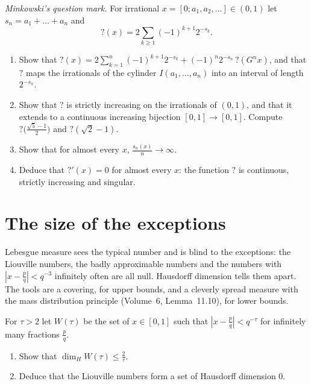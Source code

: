 \begin{exercise}[$\star\star\star$]\label{pb:minkowski}
\emph{Minkowski's question mark.} For irrational $x=[0;a_1,a_2,\dots]\in(0,1)$ let $s_n=a_1+\dots+a_n$ and
\[
?(x)=2\sum_{k\ge1}(-1)^{k+1}2^{-s_k}.
\]
\begin{enumerate}[label=(\alph*)]
\item Show that $?(x)=2\sum_{k=1}^n(-1)^{k+1}2^{-s_k}+(-1)^n2^{-s_n}\,?(G^nx)$, and that $?$ maps the irrationals of the cylinder
$I(a_1,\dots,a_n)$ into an interval of length $2^{-s_n}$.
\item Show that $?$ is strictly increasing on the irrationals of $(0,1)$, and that it extends to a continuous increasing bijection
$[0,1]\to[0,1]$. Compute $?\bigl(\frac{\sqrt5-1}2\bigr)$ and $?(\sqrt2-1)$.
\item Show that for almost every $x$, $\frac{s_n(x)}n\to\infty$.
\item Deduce that $?'(x)=0$ for almost every $x$: the function $?$ is continuous, strictly increasing and singular.
\end{enumerate}
\end{exercise}

\section{The size of the exceptions}

Lebesgue measure sees the typical number and is blind to the exceptions: the Liouville numbers, the badly approximable numbers and the
numbers with $|x-\frac pq|<q^{-3}$ infinitely often are all null. Hausdorff dimension tells them apart. The tools are a covering, for upper
bounds, and a cleverly spread measure with the mass distribution principle (Volume~6, Lemma~11.10), for lower bounds.

\begin{exercise}[$\star$]\label{pb:wtau}
For $\tau>2$ let $W(\tau)$ be the set of $x\in[0,1]$ such that $|x-\frac pq|<q^{-\tau}$ for infinitely many fractions $\frac pq$.
\begin{enumerate}[label=(\alph*)]
\item Show that $\dim_HW(\tau)\le\frac2\tau$.
\item Deduce that the Liouville numbers form a set of Hausdorff dimension $0$.
\end{enumerate}
\end{exercise}

